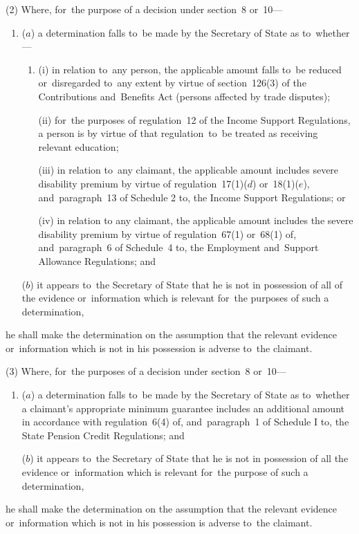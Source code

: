 \documentclass[12pt,a4paper]{article}
\begin{document}
(2) Where, for~the purpose of a decision under section~8 or~10—
\begin{enumerate}\item[]
($a$) a determination falls to~be made by the Secretary of State as to~whether—
\begin{enumerate}\item[]
(i) in relation to~any person, the applicable amount falls to~be reduced or~disregarded to~any extent by virtue of section~126(3) of the Contributions and~Benefits Act (persons affected by trade disputes);

(ii) for~the purposes of regulation~12 of the Income Support Regulations, a person is by virtue of that regulation~to~be treated as receiving relevant education; 

(iii) in relation to~any claimant, the applicable amount includes severe disability premium by virtue of regulation~17(1)($d$) or~18(1)($e$), and~paragraph~13 of Schedule 2 to, the Income Support Regulations; 
%
or

(iv) in relation to any claimant, the applicable amount includes the severe disability premium by virtue of regulation~67(1) or~68(1) of, and~paragraph~6 of Schedule~4 to, the Employment and~Support Allowance Regulations; and
\end{enumerate}

($b$) it appears to~the Secretary of State that he is not in possession of all of the evidence or~information which is relevant for~the purposes of such a determination,
\end{enumerate}
he shall make the determination on the assumption that the relevant evidence or~information which is not in his possession is adverse to~the claimant.

(3) Where, for~the purposes of a decision under section~8 or~10—
\begin{enumerate}\item[]
($a$) a determination falls to~be made by the Secretary of State as to~whether a claimant’s appropriate minimum guarantee includes an additional amount in accordance with regulation~6(4) of, and~paragraph~1 of Schedule I to, the State Pension Credit Regulations; and

($b$) it appears to~the Secretary of State that he is not in possession of all the evidence or~information which is relevant for~the purpose of such a determination,
\end{enumerate}
he shall make the determination on the assumption that the relevant evidence or~information which is not in his possession is adverse to~the claimant.
\end{document}
